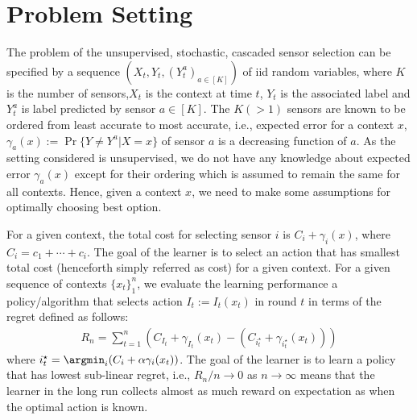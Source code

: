 \section{Problem Setting}
The problem of the unsupervised, stochastic, cascaded sensor selection can be specified by a sequence $(X_t,Y_t, (Y_t^a)_{a \in [K]})$ of iid random variables, where $K$ is the number of sensors,$X_t$ is the context at time $t$, $Y_t$ is the associated label and $Y_t^a$ is label predicted by sensor $a \in [K]$. The $K(>1)$ sensors are known to be ordered from least accurate to most accurate, i.e., expected error for a context $x$, $\gamma_a(x) := \Pr\{Y \neq Y^a|X=x\}$ of sensor $a$ is a decreasing function of $a$. As the setting considered is unsupervised, we do not have any knowledge about expected error $\gamma_a(x)$ except for their ordering which is assumed to remain the same for all contexts. Hence, given a context $x$, we need to make some assumptions for optimally choosing best option. 

For a given context, the total cost for selecting sensor $i$ is $C_i + \gamma_i(x)$, where $C_i=c_1 + \cdots + c_{i}$. The goal of the learner is to select an action that has smallest total cost (henceforth simply referred as cost) for a given context. For a given sequence of contexts $\{x_t\}_1^n$, we evaluate the learning performance a policy/algorithm that selects action $I_t:=I_t(x_t)$ in round $t$ in terms of the regret defined as follows:  
\vspace{-.1cm}
\begin{align}
\label{equ:lin_regret}
R_n = \sum_{t=1}^n\left(C_{I_t} + \gamma_{I_t}(x_t) - (C_{i^\star_t} +\gamma_{i^\star_t}(x_t))\right)
\end{align}
where 	$i_t^\star= \argmin_i(C_i + \alpha\gamma_i(x_t))$. The goal of the learner is to learn a policy that has lowest sub-linear regret, i.e., $R_n/n \rightarrow 0$ as $n \rightarrow \infty$ 
means that the learner in the long run collects almost as much reward on expectation as when  the optimal action is known. 



